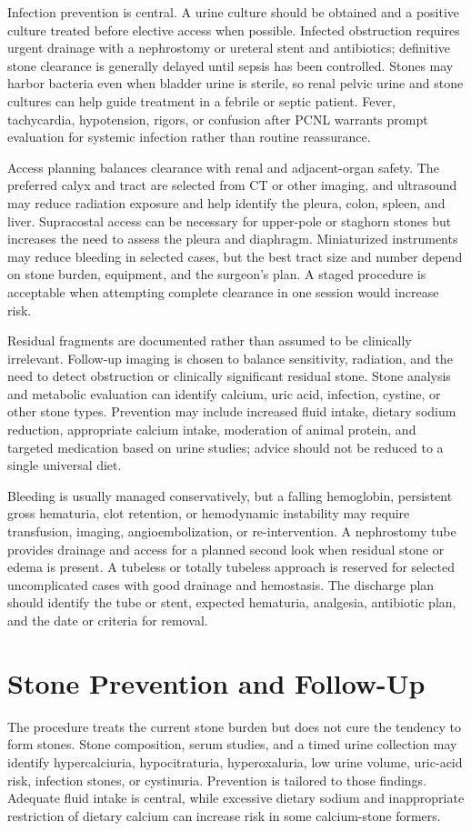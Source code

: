 Infection prevention is central. A urine culture should be obtained and a positive culture treated before elective access when possible. Infected obstruction requires urgent drainage with a nephrostomy or ureteral stent and antibiotics; definitive stone clearance is generally delayed until sepsis has been controlled. Stones may harbor bacteria even when bladder urine is sterile, so renal pelvic urine and stone cultures can help guide treatment in a febrile or septic patient. Fever, tachycardia, hypotension, rigors, or confusion after PCNL warrants prompt evaluation for systemic infection rather than routine reassurance.

Access planning balances clearance with renal and adjacent-organ safety. The preferred calyx and tract are selected from CT or other imaging, and ultrasound may reduce radiation exposure and help identify the pleura, colon, spleen, and liver. Supracostal access can be necessary for upper-pole or staghorn stones but increases the need to assess the pleura and diaphragm. Miniaturized instruments may reduce bleeding in selected cases, but the best tract size and number depend on stone burden, equipment, and the surgeon's plan. A staged procedure is acceptable when attempting complete clearance in one session would increase risk.

Residual fragments are documented rather than assumed to be clinically irrelevant. Follow-up imaging is chosen to balance sensitivity, radiation, and the need to detect obstruction or clinically significant residual stone. Stone analysis and metabolic evaluation can identify calcium, uric acid, infection, cystine, or other stone types. Prevention may include increased fluid intake, dietary sodium reduction, appropriate calcium intake, moderation of animal protein, and targeted medication based on urine studies; advice should not be reduced to a single universal diet.

Bleeding is usually managed conservatively, but a falling hemoglobin, persistent gross hematuria, clot retention, or hemodynamic instability may require transfusion, imaging, angioembolization, or re-intervention. A nephrostomy tube provides drainage and access for a planned second look when residual stone or edema is present. A tubeless or totally tubeless approach is reserved for selected uncomplicated cases with good drainage and hemostasis. The discharge plan should identify the tube or stent, expected hematuria, analgesia, antibiotic plan, and the date or criteria for removal.

\section*{Stone Prevention and Follow-Up}
The procedure treats the current stone burden but does not cure the tendency to form stones. Stone composition, serum studies, and a timed urine collection may identify hypercalciuria, hypocitraturia, hyperoxaluria, low urine volume, uric-acid risk, infection stones, or cystinuria. Prevention is tailored to those findings. Adequate fluid intake is central, while excessive dietary sodium and inappropriate restriction of dietary calcium can increase risk in some calcium-stone formers.

